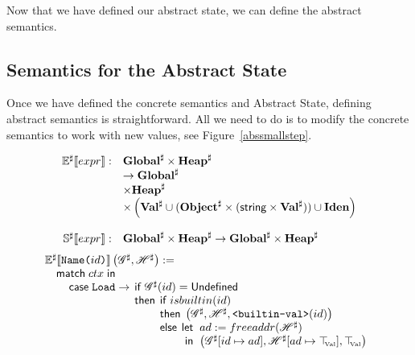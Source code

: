 Now that we have defined our abstract state, we can define the abstract semantics.

\subsection{Semantics for the Abstract State}

Once we have defined the concrete semantics and Abstract State, defining abstract
semantics is straightforward. All we need to do is to modify the concrete semantics to
work with new values, see Figure~\ref{abssmallstep}.

\begin{figure}
\[\begin{array}{rl}
  \mathbb{E^\sharp}\!\left\llbracket expr \right\rrbracket :& \mathbf{Global}^\sharp \times \mathbf{Heap}^\sharp \\
  &\to \mathbf{Global}^\sharp \\
  &\times \mathbf{Heap}^\sharp \\
  &\times \left( \mathbf{Val}^\sharp \cup (\mathbf{Object}^\sharp \times (\textsf{string} \times \mathbf{Val}^\sharp)) \cup \mathbf{Iden} \right) \\
  \\
  \mathbb{S^\sharp}\!\left\llbracket expr \right\rrbracket :& \mathbf{Global}^\sharp \times \mathbf{Heap}^\sharp \to \mathbf{Global}^\sharp \times \mathbf{Heap}^\sharp \\
\end{array}\]
\[\arraycolsep=1.4pt
  \begin{array}[t]{l}
    \Ctx{E^\sharp}{\SLit{Name}{id}}\left(\Glo^\sharp, \Hea^\sharp\right) := \\
    \quad \matchm{ctx} \\
    \qquad \begin{array}[t]{lclr}
      \casem{\SLoad} &\to&
         \begin{array}[t]{l}
            \ifm \Glo^\sharp(id) = \undefm \\
            \thenm
               \begin{array}[t]{l}
                  \ifm isbuiltin(id) \\
                  \thenm \left(\Glo^\sharp, \Hea^\sharp, \texttt{<builtin-val>}(id)\right) \\
                  \elsem
                    \begin{array}[t]{rl}
                      \letm& ad := freeaddr(\Hea^\sharp) \\
                      \inm&  \left(\Glo^\sharp[id\mapsto ad], \Hea^\sharp[ad \mapsto \Top{Val}], \Top{Val} \right) \\

\end{array}
\end{array}
\end{array}
\end{array}
\end{array}\]
\end{figure}
